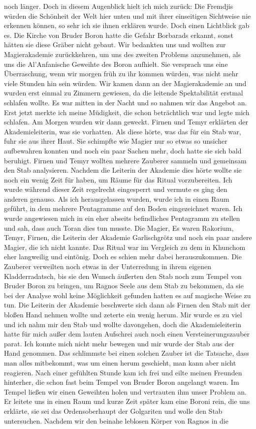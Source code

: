 noch länger. Doch in diesem Augenblick hielt ich mich zurück: Die Fremdjis würden die Schönheit der Welt hier unten und mit ihrer einseitigen Sichtweise nie erkennen können, so sehr ich sie ihnen erklären wurde. Doch einen Lichtblick gab es. Die Kirche von Bruder Boron hatte die Gefahr Borbarads erkannt, sonst hätten sie diese Gräber nicht gebaut. Wir bedankten uns und wollten zur Magierakademie zurückkehren, um uns des zweiten Problems anzunehmen, als uns die Al'Anfanische Geweihte des Boron aufhielt. Sie versprach uns eine Überraschung, wenn wir morgen früh zu ihr kommen würden, was nicht mehr viele Stunden hin sein würden. Wir kamen dann an der Magierakademie an und wurden erst einmal zu Zimmern gewiesen, da die leitende Spektabilität erstmal schlafen wollte. Es war mitten in der Nacht und so nahmen wir das Angebot an. Erst jetzt merkte ich meine Müdigkeit, die schon beträchtlich war und legte mich schlafen. Am Morgen wurden wir dann geweckt. Firnen und Temyr erklärten der Akademieleiterin, was sie vorhatten. Als diese hörte, was das für ein Stab war, fuhr sie aus ihrer Haut. Sie schimpfte wie Magier nur so etwas so unsicher aufbewahren konnten und noch ein paar Sachen mehr, doch hatte sie sich bald beruhigt. Firnen und Temyr wollten mehrere Zauberer sammeln und gemeinsam den Stab analysieren. Nachdem die Leiterin der Akademie dies hörte wollte sie noch ein wenig Zeit für haben, um Räume für das Ritual vorzubereiten. Ich wurde während dieser Zeit regelrecht eingesperrt und vermute es ging den anderen genauso. Als ich herausgelassen wurden, wurde ich in einen Raum geführt, in dem mehrere Pentagramme auf den Boden eingezeichnet waren. Ich wurde angewiesen mich in ein eher abseits befindliches Pentagramm zu stellen und sah, dass auch Toran dies tun musste. Die Magier, Es waren Rakorium, Temyr, Firnen, die Leiterin der Akademie Garlischgrötz und noch ein paar andere Magier, die ich nicht kannte. Das Ritual war im Vergleich zu dem in Khunchom eher langweilig und eintönig. Doch es schien mehr dabei herauszukommen. Die Zauberer verweilten noch etwas in der Unterredung in ihrem eigenen Kladderradatsch, bis sie den Wunsch äußerten den Stab noch zum Tempel von Bruder Boron zu bringen, um Ragnos Seele aus dem Stab zu bekommen, da sie bei der Analyse wohl keine Möglichkeit gefunden hatten es auf magische Weise zu tun. Die Leiterin der Akademie beschwerte sich dann als Firnen den Stab mit der bloßen Hand nehmen wollte und zeterte ein wenig herum. Mir wurde es zu viel und ich nahm mir den Stab und wollte davongehen, doch die Akademieleiterin hatte für mich außer dem lauten Aufschrei auch noch einen Versteinerungszauber parat. Ich konnte mich nicht mehr bewegen und mir wurde der Stab aus der Hand genommen. Das schlimmste bei einen solchen Zauber ist die Tatsache, dass man alles mitbekommt, was um einen herum geschieht, man kann aber nicht reagieren. Nach einer gefühlten Stunde kam ich frei und eilte meinen Freunden hinterher, die schon fast beim Tempel von Bruder Boron angelangt waren. Im Tempel ließen wir einen Geweihten holen und vertrauten ihm unser Problem an. Er leitete uns in einen Raum und kurze Zeit später kam eine Boroni rein, die uns erklärte, sie sei das Ordensoberhaupt der Golgariten und wolle den Stab untersuchen. Nachdem wir den beinahe leblosen Körper von Ragnos in die 